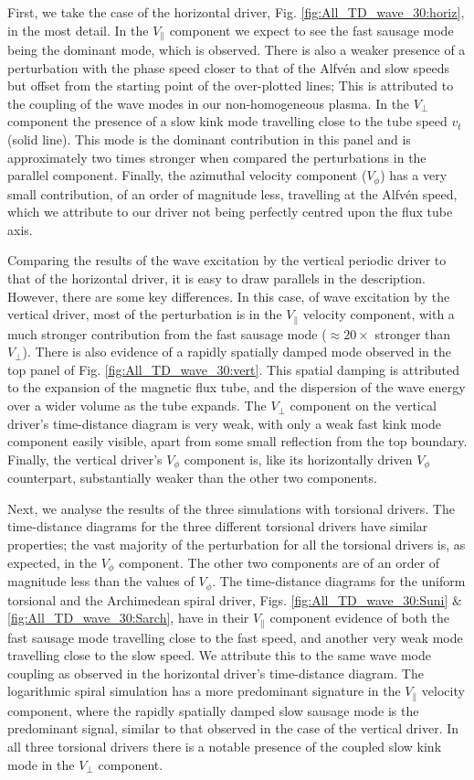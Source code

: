 First, we take the case of the horizontal driver, Fig. \ref{fig:All_TD_wave_30:horiz}, in the most detail. 
In the $V_\parallel$ component we expect to see the fast sausage mode being the dominant mode, which is observed.
There is also a weaker presence of a perturbation with the phase speed closer to that of the Alfv\'en and slow speeds but offset from the starting point of the over-plotted lines; This is attributed to the coupling of the wave modes in our non-homogeneous plasma.
In the $V_\perp$ component the presence of a slow kink mode travelling close to the tube speed $v_t$ (solid line).
This mode is the dominant contribution in this panel and is approximately two times stronger when compared the perturbations in the parallel component. 
Finally, the azimuthal velocity component ($V_\phi$) has a very small contribution, of an order of magnitude less, travelling at the Alfv\'en speed, which we attribute to our driver not being perfectly centred upon the flux tube axis.

Comparing the results of the wave excitation by the vertical periodic driver to that of the horizontal driver, it is easy to draw parallels in the description.
However, there are some key differences. 
In this case, of wave excitation by the vertical driver, most of the perturbation is in the $V_\parallel$ velocity component, with a much stronger contribution from the fast sausage mode ($\approx 20 \times$ stronger than $V_\perp$).
There is also evidence of a rapidly spatially damped mode observed in the top panel of Fig. \ref{fig:All_TD_wave_30:vert}.
This spatial damping is attributed to the expansion of the magnetic flux tube, and the dispersion of the wave energy over a wider volume as the tube expands.
The $V_\perp$ component on the vertical driver's time-distance diagram is very weak, with only a weak fast kink mode component easily visible, apart from some small reflection from the top boundary. 
Finally, the vertical driver's $V_\phi$ component is, like its horizontally driven $V_\phi$ counterpart, substantially weaker than the other two components.

Next, we analyse the results of the three simulations with torsional drivers.
The time-distance diagrams for the three different torsional drivers have similar properties; the vast majority of the perturbation for all the torsional drivers is, as expected, in the $V_\phi$ component.
The other two components are of an order of magnitude less than the values of $V_\phi$.
The time-distance diagrams for the uniform torsional and the Archimedean spiral driver, Figs. \ref{fig:All_TD_wave_30:Suni} \& \ref{fig:All_TD_wave_30:Sarch}, have in their $V_\parallel$ component evidence of both the fast sausage mode travelling close to the fast speed, and another very weak mode travelling close to the slow speed.
We attribute this to the same wave mode coupling as observed in the horizontal driver's time-distance diagram. 
The logarithmic spiral simulation has a more predominant signature in the $V_\parallel$ velocity component, where the rapidly spatially damped slow sausage mode is the predominant signal, similar to that observed in the case of the vertical driver. 
In all three torsional drivers there is a notable presence of the coupled slow kink mode in the $V_\perp$ component. 


